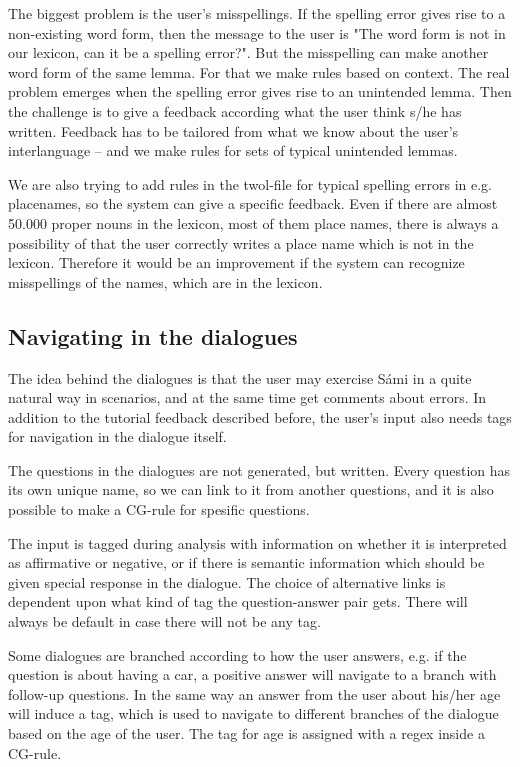\documentclass[11pt]{article}
\begin{document}
The biggest problem is the user's misspellings. If the spelling error gives rise to a non-existing word form, then the message to the user is "The word form is not in our lexicon, can it be a spelling error?". But the misspelling can make another word form of the same lemma. For that we make rules based on context. The real problem emerges when the spelling error gives rise to an unintended lemma. Then the challenge is to give a feedback according what the user think s/he has written. Feedback has to be tailored from what we know about the user’s interlanguage – and we make rules for sets of typical unintended lemmas.

We are also trying to add rules in the twol-file for typical spelling errors in e.g. placenames, so the system can give a specific feedback. Even if there are almost 50.000 proper nouns in the lexicon, most of them place names, there is always a possibility of that the user correctly writes a  place name which is not in the lexicon. Therefore it would be an improvement if the system can recognize misspellings of the names, which are in the lexicon.

\subsection{Navigating in the dialogues}
The idea behind the dialogues is that the user may exercise Sámi in a quite natural way in scenarios, and at the same time get comments about errors. In addition to the tutorial feedback described before, the user's input also needs tags for navigation in the dialogue itself.

The questions in the dialogues are not generated, but written. Every question has its own unique name, so we can link to it from another questions, and it is also possible to make a CG-rule for spesific questions.   

The input is tagged during analysis with information on whether it is interpreted as affirmative or negative, or if there is semantic information which should be given special response in the dialogue. The choice of alternative links is dependent upon what kind of tag the question-answer pair gets. There will always be default in case there will not be any tag. 
 
Some dialogues are branched according to how the user answers, e.g. if the question is about having a car, a positive answer will navigate to a branch with follow-up questions. In the same way an answer from the user about his/her age will induce a tag, which is used to navigate to different branches of the dialogue based on the age of the user. The tag for age is assigned with a regex inside a CG-rule.
\end{document}
